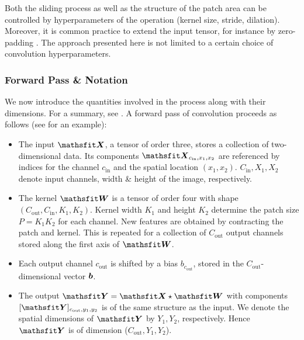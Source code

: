 Both the sliding process as well as the structure of the patch area can be
controlled by hyperparameters of the operation (kernel size, stride, dilation).
Moreover, it is common practice to extend the input tensor, for instance by
zero-padding \citep[for an introduction to the arithmetics of convolutions,
see][]{dumoulin2016ConvolutionArithmeticGuide}. The approach presented here is
not limited to a certain choice of convolution hyperparameters.

\subsubsection{Forward Pass \& Notation}
We now introduce the quantities involved in the process along with their
dimensions. For a summary, see . A
forward pass of convolution proceeds as follows (see
 for an example):

\begin{itemize}
\item The input $\tX$, a tensor of order three, stores a collection of
  two-dimensional data. Its components $\tX_{c_\text{in}, x_1, x_2}$ are
  referenced by indices for the channel $c_{\text{in}}$ and the spatial location
  $(x_1,x_2)$. $C_{\text{in}}, X_1, X_2$ denote input channels, width \& height
  of the image, respectively.

\item The kernel $\tW$ is a tensor of order four with shape $(C_{\text{out}},
  C_{\text{in}}, K_1, K_2)$. Kernel width $K_1$ and height $K_2$ determine the
  patch size $P= K_1 K_2$ for each channel. New features are obtained by
  contracting the patch and kernel. This is repeated for a collection of
  $C_{\text{out}}$ output channels stored along the first axis of $\tW$.

\item Each output channel $c_\text{out}$ is shifted by a bias
  $b_{c_\text{out}}$, stored in the $C_\text{out}$-dimensional vector ${\bm{b}}$.

\item The output $\tY = \tX \star \tW$ with components $[\tY]_{c_\text{out},
    y_1, y_2}$ is of the same structure as the input. We denote the spatial
  dimensions of $\tY$ by $Y_1, Y_2$, respectively. Hence $\tY$ is of dimension
  ($C_\text{out}, Y_1, Y_2$).
\end{itemize}


